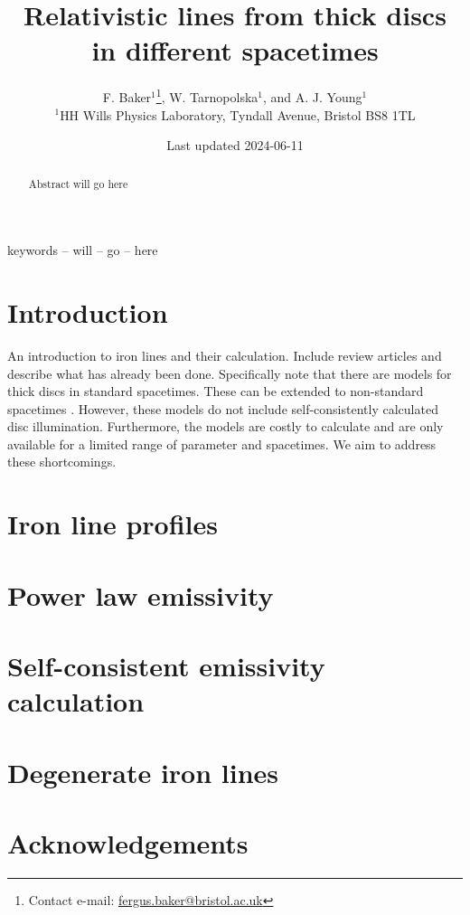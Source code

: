 \documentclass[fleqn,usenatbib,useAMS]{mnras}
\title[Relativistic disc lines]{Relativistic lines from thick discs in different spacetimes}
\author[F. Baker, et al.]{F. Baker$^{1}$\thanks{Contact e-mail: \href{mailto:fergus.baker@bristol.ac.uk}{fergus.baker@bristol.ac.uk}}, W. Tarnopolska$^{1}$, and A. J. Young$^{1}$ \\
$^{1}$HH Wills Physics Laboratory, Tyndall Avenue, Bristol BS8 1TL}
\date{Last updated 2024-06-11}
\begin{document}
\label{firstpage}
\pagerange{\pageref{firstpage}--\pageref{lastpage}}
\maketitle

\begin{abstract}
Abstract will go here
\end{abstract}

\begin{keywords}
keywords -- will -- go -- here
\end{keywords}

\section{Introduction}

An introduction to iron lines and their calculation. Include review articles and describe what has already been done. Specifically note that there are models for thick discs \citep{taylor2018} in standard spacetimes. These can be extended to non-standard spacetimes \citep{abdikamalov2020}. However, these models do not include self-consistently calculated disc illumination. Furthermore, the models are costly to calculate and are only available for a limited range of parameter and spacetimes. We aim to address these shortcomings.

\section{Iron line profiles}

\section{Power law emissivity}

\section{Self-consistent emissivity calculation}

\section{Degenerate iron lines}

\section*{Acknowledgements}
\end{document}
